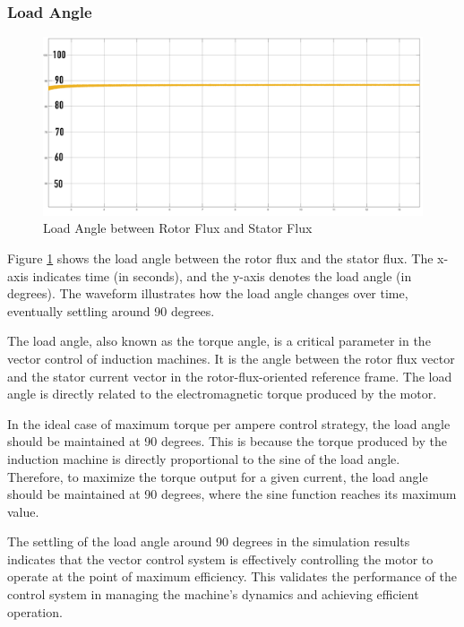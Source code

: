 \subsubsection{Load Angle}


\begin{figure}[H]
	\centering
	\includegraphics[width=6in]{sections/section3/images/simulationResutls/LoadAngle.png}
	\caption{Load Angle between Rotor Flux and Stator Flux}
	\label{fig:load_angle_1}
\end{figure}

Figure \ref{fig:load_angle_1} shows the load angle between the rotor flux and the stator flux. The x-axis indicates time (in seconds), and the y-axis denotes the load angle (in degrees). The waveform illustrates how the load angle changes over time, eventually settling around 90 degrees.

The load angle, also known as the torque angle, is a critical parameter in the vector control of induction machines. It is the angle between the rotor flux vector and the stator current vector in the rotor-flux-oriented reference frame. The load angle is directly related to the electromagnetic torque produced by the motor. 

In the ideal case of maximum torque per ampere control strategy, the load angle should be maintained at 90 degrees. This is because the torque produced by the induction machine is directly proportional to the sine of the load angle. Therefore, to maximize the torque output for a given current, the load angle should be maintained at 90 degrees, where the sine function reaches its maximum value.

The settling of the load angle around 90 degrees in the simulation results indicates that the vector control system is effectively controlling the motor to operate at the point of maximum efficiency. This validates the performance of the control system in managing the machine's dynamics and achieving efficient operation.


